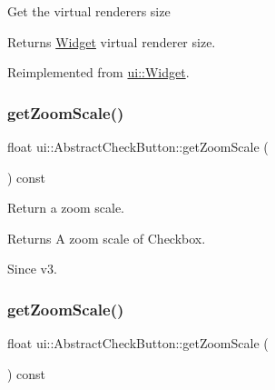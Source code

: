 Get the virtual renderer\textquotesingle{}s size \begin{DoxyReturn}{Returns}
\hyperlink{classui_1_1Widget}{Widget} virtual renderer size. 
\end{DoxyReturn}


Reimplemented from \hyperlink{classui_1_1Widget_a2ed0d41565593f78dc59c975d58a869e}{ui\+::\+Widget}.

\mbox{\label{classui_1_1AbstractCheckButton_aa63466704ea2e8d375796d0a1ca4f1b8}} 
\subsubsection{\texorpdfstring{get\+Zoom\+Scale()}{getZoomScale()}\hspace{0.1cm}{\footnotesize\ttfamily [1/2]}}
{\footnotesize\ttfamily float ui\+::\+Abstract\+Check\+Button\+::get\+Zoom\+Scale (\begin{DoxyParamCaption}{ }\end{DoxyParamCaption}) const}



Return a zoom scale. 

\begin{DoxyReturn}{Returns}
A zoom scale of Checkbox. 
\end{DoxyReturn}
\begin{DoxySince}{Since}
v3. 
\end{DoxySince}
\mbox{\label{classui_1_1AbstractCheckButton_aa63466704ea2e8d375796d0a1ca4f1b8}} 
\subsubsection{\texorpdfstring{get\+Zoom\+Scale()}{getZoomScale()}\hspace{0.1cm}{\footnotesize\ttfamily [2/2]}}
{\footnotesize\ttfamily float ui\+::\+Abstract\+Check\+Button\+::get\+Zoom\+Scale (\begin{DoxyParamCaption}{ }\end{DoxyParamCaption}) const}



